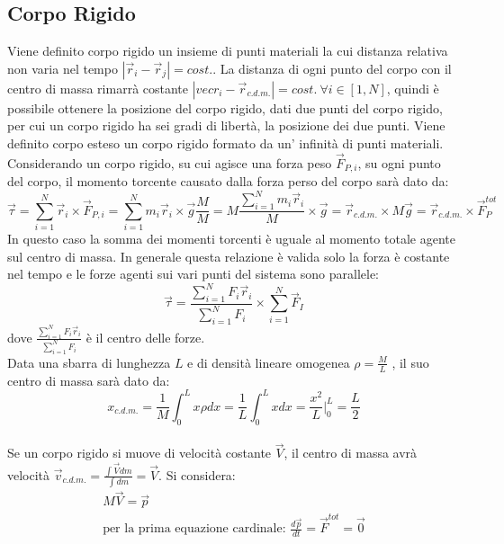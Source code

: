 \documentclass{article}
\numberwithin{equation}{subsection}
\begin{document}
\subsection{Corpo Rigido}
Viene definito corpo rigido un insieme di punti materiali la 
cui distanza relativa non varia nel tempo $|\vec{r}_i-\vec{r}_j|=cost.$. 
La distanza di ogni punto del corpo con il centro di massa 
rimarrà costante $|vec{r}_i-\vec{r}_{c.d.m.}|=cost.\:\forall i\in[1,N]$, quindi è possibile ottenere la posizione 
del corpo rigido, dati due punti del corpo rigido, per cui un 
corpo rigido ha sei gradi di libertà, la posizione dei due punti. 
Viene definito corpo esteso un corpo rigido formato da un'
infinità di punti materiali.\\
Considerando un corpo rigido, su cui agisce una forza peso $\vec{F}_{{P,i}}$, 
su ogni punto del corpo, il momento torcente causato dalla forza 
perso del corpo sarà dato da: 
\begin{equation}
    \vec{\tau}=\displaystyle\sum_{i=1}^{N}\vec{r}_i\times\vec{F}_{P,i}=
    \displaystyle\sum_{i=1}^{N}m_i\vec{r}_i\times\vec{g}\frac{M}{M}=
    M\displaystyle\frac{\sum_{i=1}^{N}m_i\vec{r}_i}{M}\times\vec{g}=
    \vec{r}_{c.d.m.}\times M\vec{g}=
    \vec{r}_{c.d.m.}\times \vec{F}_P^{tot}
\end{equation}
In questo caso la somma dei momenti torcenti è uguale al 
momento totale agente sul centro di massa. In generale questa 
relazione è valida solo la forza è costante nel tempo e le 
forze agenti sui vari punti del sistema sono parallele: 
\begin{equation}
    \vec{\tau}=\displaystyle\frac{\sum_{i=1}^{N}F_i\vec{r}_i}{\sum_{i=1}^{N}F_i}\times\sum_{i=1}^{N}\vec{F}_I
\end{equation}
dove $\displaystyle\frac{\sum_{i=1}^{N}F_i\vec{r}_i}{\sum_{i=1}^{N}F_i}$ 
è il centro delle forze.\\
Data una sbarra di lunghezza $L$ e di densità lineare omogenea $\rho=\displaystyle\frac{M}{L}$ , 
il suo centro di massa sarà dato da:
\begin{equation}
    x_{c.d.m.}=\displaystyle\frac{1}{M}\int_{0}^{L}x\rho dx=\frac{1}{L}\int_{0}^{L}xdx=\frac{x^2}{L}\Bigg|_0^L=\frac{L}{2} 
\end{equation}\\
Se un corpo rigido si muove di velocità costante $\vec{V}$, 
il centro di massa avrà velocità $\vec{v}_{c.d.m.}=\displaystyle\frac{\int\vec{V}dm}{\int dm}=\vec{V}$. 
Si considera:
\begin{gather}
    M\vec{V}=\vec{p}\\
    \mbox{per la prima equazione cardinale: }
    \displaystyle\frac{d\vec{p}}{dt}=\vec{F}^{tot}=\vec0
\end{gather}
\end{document}
